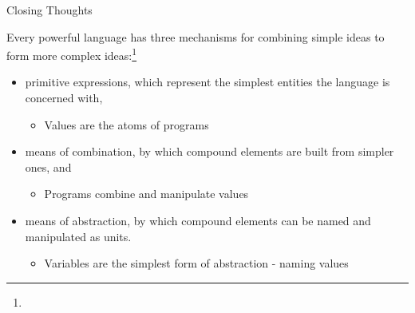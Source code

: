 \documentclass{beamer}
\begin{document}
\begin{frame}[fragile]{Closing Thoughts}

Every powerful language has three mechanisms for  combining simple ideas to form more complex ideas:\footnote{}

\begin{itemize}
\item primitive expressions, which represent the simplest entities the language is concerned with,
\begin{itemize}
\item Values are the atoms of programs
\end{itemize}

\item means of combination, by which compound elements are built from simpler ones, and
\begin{itemize}
\item Programs combine and manipulate values
\end{itemize}

\item means of abstraction, by which compound elements can be named and manipulated as units.
\begin{itemize}
\item Variables are the simplest form of abstraction - naming values
\end{itemize}

\end{itemize}


\end{frame}







\end{document}
